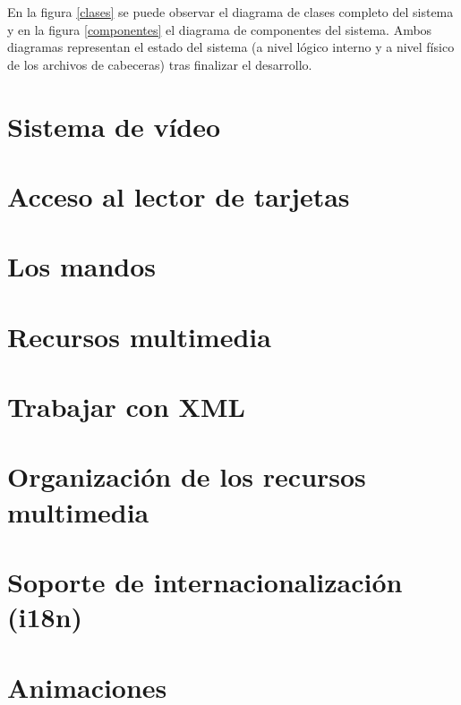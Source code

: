 En la figura \ref{clases} se puede observar el diagrama de clases completo del sistema y en la figura \ref{componentes} el diagrama de componentes del sistema. Ambos diagramas representan el estado del sistema (a nivel lógico interno y a nivel físico de los archivos de cabeceras) tras finalizar el desarrollo.\\



\section{Sistema de vídeo}
\label{labelvideo}


\section{Acceso al lector de tarjetas}
\label{labeltarjeta}


\section{Los mandos}
\label{labelmandos}


\section{Recursos multimedia}
\label{labelrecursos}


\section{Trabajar con XML}
\label{labelparser}


\section{Organización de los recursos multimedia}
\label{labelgaleria}


\section{Soporte de internacionalización (i18n)}
\label{labelidiomas}


\section{Animaciones}
\label{labelanimaciones}


